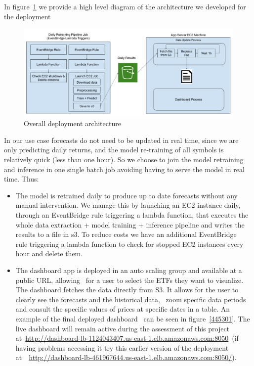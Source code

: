\documentclass[10pt]{article}
\providecommand{\tightlist}{\setlength{\itemsep}{0pt}\setlength{\parskip}{0pt}}%
\begin{document}
{\label{326741}}

In figure~{\ref{178032}} we provide a high level
diagram of the architecture we developed for the deployment
\begin{figure}[H]
\begin{center}
\includegraphics[width=0.98\columnwidth]{figures/arch/arch}
\caption{{Overall deployment architecture
{\label{178032}}%
}}
\end{center}
\end{figure}

In our use case forecasts do not need to be updated in real time, since
we are only predicting daily returns, and the model re-training of all
symbols is relatively quick (less than one hour). So we choose to join
the model retraining and inference in one single batch job avoiding
having to serve the model in real time. Thus:

\begin{itemize}
\tightlist
\item
  The model is retrained daily to produce up to date forecasts without
  any manual intervention. We manage this by launching an EC2 instance
  daily, through an EventBridge rule triggering a lambda function, that
  executes the whole data extraction + model training + inference
  pipeline and writes the results to a file in s3. To reduce costs we
  have an additional EventBridge~ rule triggering a lambda function to
  check for stopped EC2 instances every hour and delete them.
\item
  The dashboard app is deployed in an auto scaling group and available
  at a public URL, allowing~ for a user to select the ETFs they want to
  visualize. The dashboard fetches the data directly from S3. It allows
  for the user to clearly see the forecasts and the historical data,~
  zoom specific data periods and consult the specific values of prices
  at specific dates in a table. An example of the final deployed
  dashboard~ can be seen in figure~{\ref{445301}}. The
  live dashboard will remain active during the assessment of this
  project
  at~\url{http://dashboard-lb-1124043407.us-east-1.elb.amazonaws.com:8050}~(if
  having problems accessing it try this earlier version of the
  deployment~
  at~~\url{http://dashboard-lb-461967644.us-east-1.elb.amazonaws.com:8050/}).
\end{itemize}
\end{document}
